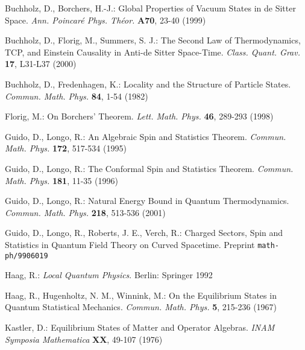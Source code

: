 \documentclass[a4paper,11pt]{article}
\begin{document}
\begin{thebibliography}{*****}

 Buchholz, D., Borchers, H.-J.: Global Properties of Vacuum
States in de Sitter Space. {\it Ann. Poincar\'e Phys. Th\'eor.} {\bf A70}, 23-40 (1999)

 Buchholz, D., Florig, M., Summers, S. J.: The Second
Law of Thermodynamics, TCP, and Einstein Causality in Anti-de Sitter
Space-Time. {\it Class. Quant. Grav.} {\bf 17}, L31-L37 (2000)

 Buchholz, D., Fredenhagen, K.: Locality and the Structure of
Particle States. {\it Commun. Math. Phys.} {\bf 84}, 1-54 (1982)



 Florig, M.: On Borchers' Theorem. {\it Lett. Math. Phys.}
{\bf 46}, 289-293 (1998)

 Guido, D., Longo, R.: An Algebraic Spin and Statistics Theorem.
{\it Commun. Math. Phys.} {\bf 172}, 517-534 (1995)

 Guido, D., Longo, R.: The Conformal Spin and Statistics Theorem.
{\it Commun. Math. Phys.} {\bf 181}, 11-35 (1996)

 Guido, D., Longo, R.: Natural Energy Bound in Quantum
Thermodynamics. {\it Commun. Math. Phys.} {\bf 218}, 513-536 (2001)

 Guido, D., Longo, R., Roberts, J. E., Verch, R.: Charged
Sectors, Spin and Statistics in Quantum Field Theory on Curved
Spacetime. Preprint {\tt math-ph/9906019}

 Haag, R.: {\it Local Quantum Physics}. Berlin: Springer 1992

 Haag, R., Hugenholtz, N. M., Winnink, M.: On the Equilibrium
States in Quantum Statistical Mechanics. {\it Commun. Math. Phys.} {\bf 5},
215-236 (1967)


 Kastler, D.: Equilibrium States of Matter and Operator
Algebras. {\it INAM Symposia Mathematica} {\bf XX}, 49-107 (1976)


\end{thebibliography}
\end{document}
